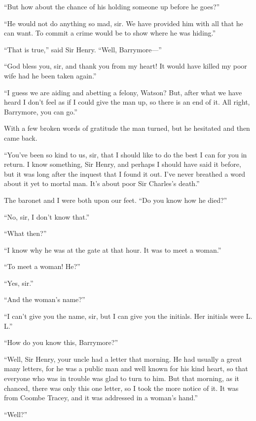 \documentclass[paper=a5,BCOR=7mm,twoside,DIV=calc,12pt,usegeometry,openany,chapterprefix,endperiod,headings=big]{scrbook} %
\begin{document}
\enquote{But how about the chance of his holding someone up before he goes?}

\enquote{He would not do anything so mad, sir. We have provided him with all that he can want. To commit a crime would be to show where he was hiding.}

\enquote{That is true,} said Sir Henry. \enquote{Well, Barrymore---}

\enquote{God bless you, sir, and thank you from my heart! It would have killed my poor wife had he been taken again.}

\enquote{I guess we are aiding and abetting a felony, Watson? But, after what we have heard I don't feel as if I could give the man up, so there is an end of it. All right, Barrymore, you can go.}

With a few broken words of gratitude the man turned, but he hesitated and then came back.

\enquote{You've been so kind to us, sir, that I should like to do the best I can for you in return. I know something, Sir Henry, and perhaps I should have said it before, but it was long after the inquest that I found it out. I've never breathed a word about it yet to mortal man. It's about poor Sir Charles's death.}

The baronet and I were both upon our feet. \enquote{Do you know how he died?}

\enquote{No, sir, I don't know that.}

\enquote{What then?}

\enquote{I know why he was at the gate at that hour. It was to meet a woman.}

\enquote{To meet a woman! He?}

\enquote{Yes, sir.}

\enquote{And the woman's name?}

\enquote{I can't give you the name, sir, but I can give you the initials. Her initials were L. L.}

\enquote{How do you know this, Barrymore?}

\enquote{Well, Sir Henry, your uncle had a letter that morning. He had usually a great many letters, for he was a public man and well known for his kind heart, so that everyone who was in trouble was glad to turn to him. But that morning, as it chanced, there was only this one letter, so I took the more notice of it. It was from Coombe Tracey, and it was addressed in a woman's hand.}

\enquote{Well?}
\end{document}
